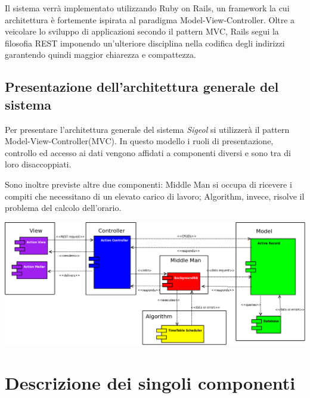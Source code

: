 \documentclass[11pt,a4paper]{article}
\begin{document}
Il sistema verrà implementato utilizzando Ruby on Rails, un framework la cui architettura è fortemente ispirata al paradigma Model-View-Controller. 
Oltre a veicolare lo sviluppo di applicazioni secondo il pattern MVC, Rails segui la filosofia REST imponendo un’ulteriore disciplina nella codifica degli indirizzi garantendo quindi maggior chiarezza e compattezza.


\subsection{Presentazione dell'architettura generale del sistema}
Per presentare l'architettura generale del sistema \textit{Sigeol} si utilizzerà il pattern Model-View-Controller(MVC).
In questo modello i ruoli di presentazione, controllo ed accesso ai dati vengono affidati a componenti diversi e sono tra di loro disaccoppiati.

Sono inoltre previste altre due componenti: Middle Man si occupa di ricevere i compiti che necessitano di un elevato carico di lavoro; Algorithm, invece, risolve il problema del calcolo dell'orario.

\begin{center}
\includegraphics[scale=0.3]{images/component_diagram.png}
\end{center}

\section{Descrizione dei singoli componenti}
\end{document}
